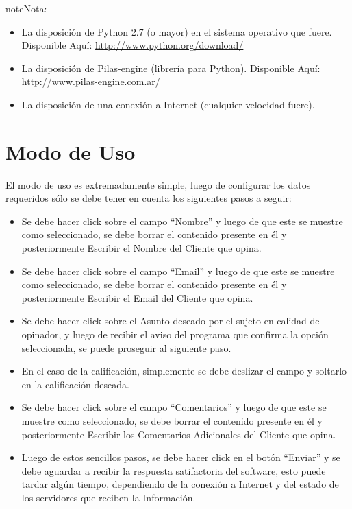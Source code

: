 \documentclass[letterpaper,10pt,spanish]{sphinxmanual}
\begin{document}
\begin{notice}{note}{Nota:}\begin{itemize}
\item {} 
La disposición de Python 2.7 (o mayor) en el sistema operativo que fuere. Disponible Aquí: \href{http://www.python.org/download/}{http://www.python.org/download/}

\item {} 
La disposición de Pilas-engine (librería para Python). Disponible Aquí: \href{http://www.pilas-engine.com.ar/}{http://www.pilas-engine.com.ar/}

\item {} 
La disposición de una conexión a Internet (cualquier velocidad fuere).

\end{itemize}
\end{notice}


\section{Modo de Uso}
\label{Opinia:modo-de-uso}
El modo de uso es extremadamente simple, luego de configurar los datos requeridos sólo se debe tener en cuenta los siguientes pasos a seguir:
\begin{itemize}
\item {} 
Se debe hacer click sobre el campo ``Nombre'' y luego de que este se muestre como seleccionado, se debe borrar el contenido presente en él y posteriormente Escribir el Nombre del Cliente que opina.

\item {} 
Se debe hacer click sobre el campo ``Email'' y luego de que este se muestre como seleccionado, se debe borrar el contenido presente en él y posteriormente Escribir el Email del Cliente que opina.

\item {} 
Se debe hacer click sobre el Asunto deseado por el sujeto en calidad de opinador, y luego de recibir el aviso del programa que confirma la opción seleccionada, se puede proseguir al siguiente paso.

\item {} 
En el caso de la calificación, simplemente se debe deslizar el campo y soltarlo en la calificación deseada.

\item {} 
Se debe hacer click sobre el campo ``Comentarios'' y luego de que este se muestre como seleccionado, se debe borrar el contenido presente en él y posteriormente Escribir los Comentarios Adicionales del Cliente que opina.

\item {} 
Luego de estos sencillos pasos, se debe hacer click en el botón ``Enviar'' y se debe aguardar a recibir la respuesta satifactoria del software, esto puede tardar algún tiempo, dependiendo de la conexión a Internet y del estado de los servidores que reciben la Información.

\end{itemize}
\end{document}

